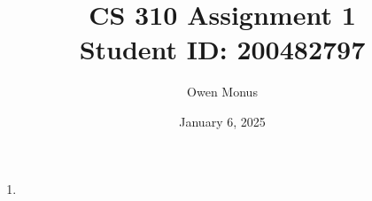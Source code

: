 \documentclass{article}
\begin{document}
\pagestyle{fancy} %

\thispagestyle{empty}
\renewcommand{\headrulewidth}{0pt} %

\title{CS 310 Assignment 1 \\[0.5cm]\large Student ID: 200482797}
\author{Owen Monus}
\date{January 6, 2025}

\maketitle

\begin{enumerate}
    \item 
\end{enumerate}
\end{document}
